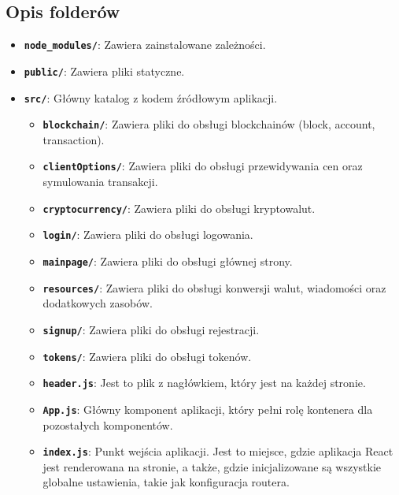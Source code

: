 \subsection{Opis folderów}

\begin{itemize}
    \item \textbf{\texttt{node\_modules/}}: Zawiera zainstalowane zależności.
    \item \textbf{\texttt{public/}}: Zawiera pliki statyczne.
    \item \textbf{\texttt{src/}}: Główny katalog z kodem źródłowym aplikacji.
    \begin{itemize}
        \item \textbf{\texttt{blockchain/}}: Zawiera pliki do obsługi blockchainów (block, account, transaction).
        \item \textbf{\texttt{clientOptions/}}: Zawiera pliki do obsługi przewidywania cen oraz symulowania transakcji.
        \item \textbf{\texttt{cryptocurrency/}}: Zawiera pliki do obsługi kryptowalut.
        \item \textbf{\texttt{login/}}: Zawiera pliki do obsługi logowania.
        \item \textbf{\texttt{mainpage/}}: Zawiera pliki do obsługi głównej strony.
        \item \textbf{\texttt{resources/}}: Zawiera pliki do obsługi konwersji walut, wiadomości oraz dodatkowych zasobów.
        \item \textbf{\texttt{signup/}}: Zawiera pliki do obsługi rejestracji.
        \item \textbf{\texttt{tokens/}}: Zawiera pliki do obsługi tokenów.
        \item \textbf{\texttt{header.js}}: Jest to plik z nagłówkiem, który jest na każdej stronie.
        \item \textbf{\texttt{App.js}}: Główny komponent aplikacji, który pełni rolę kontenera dla pozostałych komponentów.
        \item \textbf{\texttt{index.js}}: Punkt wejścia aplikacji. Jest to miejsce, gdzie aplikacja React jest renderowana na stronie, a także, gdzie inicjalizowane są wszystkie globalne ustawienia, takie jak konfiguracja routera.
    \end{itemize}
\end{itemize}
